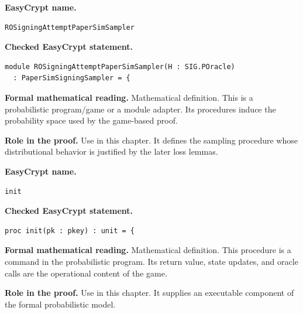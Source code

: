 \begin{formaldefinition}
\noindent\textbf{EasyCrypt name.}
\begin{lstlisting}[language=EasyCrypt,basicstyle=\ttfamily\scriptsize]
ROSigningAttemptPaperSimSampler
\end{lstlisting}
\noindent\textbf{Checked EasyCrypt statement.}
\begin{lstlisting}[language=EasyCrypt,basicstyle=\ttfamily\scriptsize]
module ROSigningAttemptPaperSimSampler(H : SIG.POracle)
  : PaperSimSigningSampler = {
\end{lstlisting}
\noindent\textbf{Formal mathematical reading.}
Mathematical definition. This is a probabilistic program/game or a module adapter.  Its procedures induce the probability space used by the game-based proof.

\noindent\textbf{Role in the proof.}
Use in this chapter. It defines the sampling procedure whose distributional behavior is justified by the later loss lemmas.

\end{formaldefinition}

\begin{formaldefinition}
\noindent\textbf{EasyCrypt name.}
\begin{lstlisting}[language=EasyCrypt,basicstyle=\ttfamily\scriptsize]
init
\end{lstlisting}
\noindent\textbf{Checked EasyCrypt statement.}
\begin{lstlisting}[language=EasyCrypt,basicstyle=\ttfamily\scriptsize]
proc init(pk : pkey) : unit = {
\end{lstlisting}
\noindent\textbf{Formal mathematical reading.}
Mathematical definition. This procedure is a command in the probabilistic program.  Its return value, state updates, and oracle calls are the operational content of the game.

\noindent\textbf{Role in the proof.}
Use in this chapter. It supplies an executable component of the formal probabilistic model.

\end{formaldefinition}

